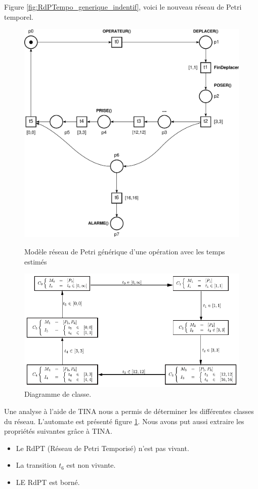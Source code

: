 Figure \ref{fig:RdPTempo_generique_indentif}, voici le nouveau réseau de Petri temporel.
\begin{figure}[!ht]
\begin{minipage}[t]{.4\textwidth}
\centering
\includegraphics[width=.8\textwidth]{./I/images/III-1_v3_esti.pdf}
\caption{\label{fig:RdPTempo_generique_indentif}Modèle réseau de Petri générique d'une opération avec les temps estimés}
\end{minipage}\hfill%
\begin{minipage}[t]{.58\textwidth}
\centering
\includegraphics[width=.9\textwidth]{./I/images/III-1_v3_aut.pdf}
\caption{\label{fig:III-1-automate}Diagramme de classe.}
\end{minipage}
\end{figure}
Une analyse à l'aide de TINA nous a permis de déterminer les différentes classes du réseau. L'automate est présenté figure \ref{fig:III-1-automate}. Nous avons put aussi extraire les propriétés suivantes grâce à TINA.

\begin{itemize}
\item Le RdPT (Réseau de Petri Temporisé) n'est pas vivant. 
\item La transition $t_6$ est non vivante. 
\item LE RdPT est borné.
\end{itemize}

